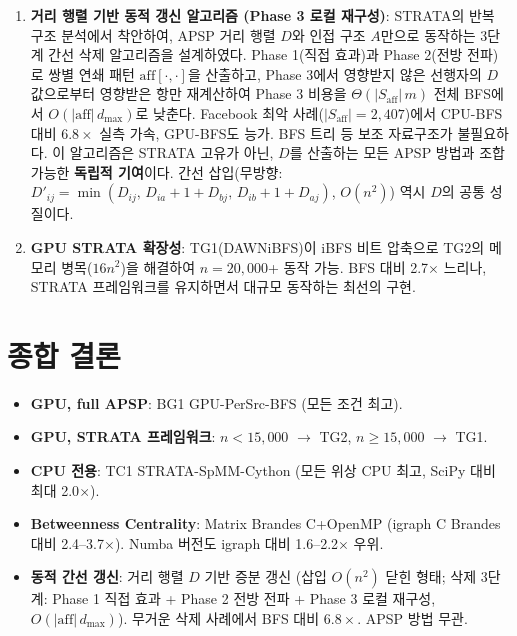 \documentclass[11pt,a4paper]{article}
\begin{document}
\begin{keypoint}[연구 기여]
\begin{enumerate}[leftmargin=1.4em]
  \item \textbf{거리 행렬 기반 동적 갱신 알고리즘 (Phase 3 로컬 재구성)}: STRATA의 반복 구조 분석에서 착안하여, APSP 거리 행렬 $D$와 인접 구조 $A$만으로 동작하는 3단계 간선 삭제 알고리즘을 설계하였다. Phase 1(직접 효과)과 Phase 2(전방 전파)로 쌍별 연쇄 패턴 $\mathrm{aff}[\cdot,\cdot]$을 산출하고, Phase 3에서 영향받지 않은 선행자의 $D$ 값으로부터 영향받은 항만 재계산하여 Phase 3 비용을 $\Theta(|S_{\mathrm{aff}}|\,m)$ 전체 BFS에서 $O(|\mathrm{aff}|\,d_{\max})$로 낮춘다. Facebook 최악 사례($|S_{\mathrm{aff}}|=2{,}407$)에서 CPU-BFS 대비 $6.8\times$ 실측 가속, GPU-BFS도 능가. BFS 트리 등 보조 자료구조가 불필요하다. 이 알고리즘은 STRATA 고유가 아닌, $D$를 산출하는 모든 APSP 방법과 조합 가능한 \textbf{독립적 기여}이다. 간선 삽입(무방향: $D'_{ij} = \min(D_{ij},\, D_{ia}+1+D_{bj},\, D_{ib}+1+D_{aj})$, $O(n^2)$) 역시 $D$의 공통 성질이다.

  \item \textbf{GPU STRATA 확장성}: TG1(DAWNiBFS)이 iBFS 비트 압축으로 TG2의 메모리 병목($16n^2$)을 해결하여 $n = 20{,}000$+ 동작 가능. BFS 대비 2.7$\times$ 느리나, STRATA 프레임워크를 유지하면서 대규모 동작하는 최선의 구현.
\end{enumerate}
\end{keypoint}

\section{종합 결론}

\begin{bluebox}
\begin{itemize}[leftmargin=1.4em]
  \item \textbf{GPU, full APSP}: BG1 GPU-PerSrc-BFS (모든 조건 최고).
  \item \textbf{GPU, STRATA 프레임워크}: $n < 15{,}000$ $\to$ TG2, $n \geq 15{,}000$ $\to$ TG1.
  \item \textbf{CPU 전용}: TC1 STRATA-SpMM-Cython (모든 위상 CPU 최고, SciPy 대비 최대 2.0$\times$).
  \item \textbf{Betweenness Centrality}: Matrix Brandes C+OpenMP (igraph C Brandes 대비 2.4--3.7$\times$). Numba 버전도 igraph 대비 1.6--2.2$\times$ 우위.
  \item \textbf{동적 간선 갱신}: 거리 행렬 $D$ 기반 증분 갱신 (삽입 $O(n^2)$ 닫힌 형태; 삭제 3단계: Phase 1 직접 효과 + Phase 2 전방 전파 + Phase 3 로컬 재구성, $O(|\mathrm{aff}|\,d_{\max})$). 무거운 삭제 사례에서 BFS 대비 $6.8\times$. APSP 방법 무관.
\end{itemize}
\end{bluebox}
\end{document}
